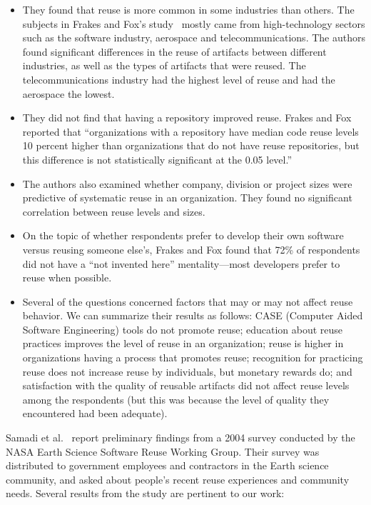 \documentclass{casicswhitepaper}
\begin{document}
\begin{itemize}

\item They found that reuse is more common in some industries than others.  The subjects in Frakes and Fox's study~\cite{frakes1995sixteen} mostly came from high-technology sectors such as the software industry, aerospace and telecommunications.  The authors found significant differences in the reuse of artifacts between different industries, as well as the types of artifacts that were reused.  The telecommunications industry had the highest level of reuse and had the aerospace the lowest.

\item They did not find that having a repository improved reuse.  Frakes and Fox reported that ``organizations with a repository have median code reuse levels 10 percent higher than organizations that do not have reuse repositories, but this difference is not statistically significant at the 0.05 level.''

\item The authors also examined whether company, division or project sizes were predictive of systematic reuse in an organization.  They found no significant correlation between reuse levels and sizes.

\item On the topic of whether respondents prefer to develop their own software versus reusing someone else's, Frakes and Fox found that 72\% of respondents did not have a ``not invented here'' mentality---most developers prefer to reuse when possible.

\item Several of the questions concerned factors that may or may not affect reuse behavior.  We can summarize their results as follows: CASE (Computer Aided Software Engineering) tools do not promote reuse; education about reuse practices improves the level of reuse in an organization; reuse is higher in organizations having a process that promotes reuse;  recognition for practicing reuse does not increase reuse by individuals, but monetary rewards do; and satisfaction with the quality of reusable artifacts did not affect reuse levels among the respondents (but this was because the level of quality they encountered had been adequate).

\end{itemize}

Samadi et al.~\cite{samadi_2004} report preliminary findings from a 2004 survey conducted by the NASA Earth Science Software Reuse Working Group. Their survey was distributed to government employees and contractors in the Earth science community, and asked about people's recent reuse experiences and community needs.  Several results from the study are pertinent to our work:
\end{document}
